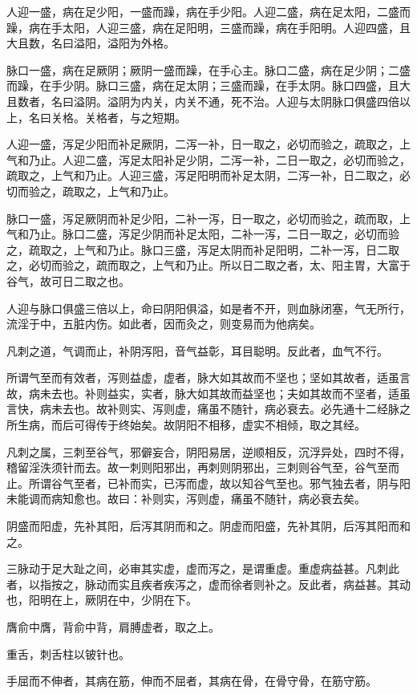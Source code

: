 \documentclass[a4paper,12pt,UTF8,twoside]{ctexbook}
\begin{document}
	人迎一盛，病在足少阳，一盛而躁，病在手少阳。人迎二盛，病在足太阳，二盛而躁，病在手太阳，人迎三盛，病在足阳明，三盛而躁，病在手阳明。人迎四盛，且大且数，名曰溢阳，溢阳为外格。
	
	脉口一盛，病在足厥阴；厥阴一盛而躁，在手心主。脉口二盛，病在足少阴；二盛而躁，在手少阴。脉口三盛，病在足太阴；三盛而躁，在手太阴。脉口四盛，且大且数者，名曰溢阴。溢阴为内关，内关不通，死不治。人迎与太阴脉口俱盛四倍以上，名曰关格。关格者，与之短期。
	
	人迎一盛，泻足少阳而补足厥阴，二泻一补，日一取之，必切而验之，疏取之，上气和乃止。人迎二盛，泻足太阳补足少阴，二泻一补，二日一取之，必切而验之，疏取之，上气和乃止。人迎三盛，泻足阳明而补足太阴，二泻一补，日二取之，必切而验之，疏取之，上气和乃止。
	
	脉口一盛，泻足厥阴而补足少阳，二补一泻，日一取之，必切而验之，疏而取，上气和乃止。脉口二盛，泻足少阴而补足太阳，二补一泻，二日一取之，必切而验之，疏取之，上气和乃止。脉口三盛，泻足太阴而补足阳明，二补一泻，日二取之，必切而验之，疏而取之，上气和乃止。所以日二取之者，太、阳主胃，大富于谷气，故可日二取之也。
	
	人迎与脉口俱盛三倍以上，命曰阴阳俱溢，如是者不开，则血脉闭塞，气无所行，流淫于中，五脏内伤。如此者，因而灸之，则变易而为他病矣。
	
	凡刺之道，气调而止，补阴泻阳，音气益彰，耳目聪明。反此者，血气不行。
	
	所谓气至而有效者，泻则益虚，虚者，脉大如其故而不坚也；坚如其故者，适虽言故，病未去也。补则益实，实者，脉大如其故而益坚也；夫如其故而不坚者，适虽言快，病未去也。故补则实、泻则虚，痛虽不随针，病必衰去。必先通十二经脉之所生病，而后可得传于终始矣。故阴阳不相移，虚实不相倾，取之其经。
	
	凡刺之属，三刺至谷气，邪僻妄合，阴阳易居，逆顺相反，沉浮异处，四时不得，稽留淫泆须针而去。故一刺则阳邪出，再刺则阴邪出，三刺则谷气至，谷气至而止。所谓谷气至者，已补而实，已泻而虚，故以知谷气至也。邪气独去者，阴与阳未能调而病知愈也。故曰：补则实，泻则虚，痛虽不随针，病必衰去矣。
	
	阴盛而阳虚，先补其阳，后泻其阴而和之。阴虚而阳盛，先补其阴，后泻其阳而和之。
	
	三脉动于足大趾之间，必审其实虚，虚而泻之，是谓重虚。重虚病益甚。凡刺此者，以指按之，脉动而实且疾者疾泻之，虚而徐者则补之。反此者，病益甚。其动也，阳明在上，厥阴在中，少阴在下。
	
	膺俞中膺，背俞中背，肩膊虚者，取之上。
	
	重舌，刺舌柱以铍针也。
	
	手屈而不伸者，其病在筋，伸而不屈者，其病在骨，在骨守骨，在筋守筋。
	
\end{document}
